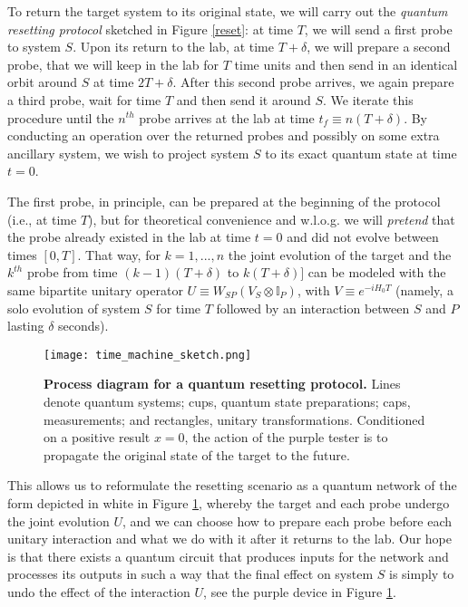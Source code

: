 \documentclass[twocolumn,prx,aps,longbibliography]{revtex4-1}
\def\id{{\mathbb I}}
\def\id{{\mathbb I}}
\begin{document}
To return the target system to its original state, we will carry out the \emph{quantum resetting protocol} sketched in Figure \ref{reset}: at time $T$, we will send a first probe to system $S$. Upon its return to the lab, at time $T+\delta$, we will prepare a second probe, that we will keep in the lab for $T$ time units and then send in an identical orbit around $S$ at time $2T+\delta$. After this second probe arrives, we again prepare a third probe, wait for time $T$ and then send it around $S$. We iterate this procedure until the $n^{th}$ probe arrives at the lab at time $t_f\equiv n(T+\delta)$. By conducting an operation over the returned probes and possibly on some extra ancillary system, we wish to project system $S$ to its exact quantum state at time $t=0$. 

The first probe, in principle, can be prepared at the beginning of the protocol (i.e., at time $T$), but for theoretical convenience and w.l.o.g. we will \emph{pretend} that the probe already existed in the lab at time $t=0$ and did not evolve between times $[0,T]$. That way, for $k=1,...,n$ the joint evolution of the target and the $k^{th}$ probe from time $(k-1)(T+\delta)$ to $k(T+\delta)]$ can be modeled with the same bipartite unitary operator $U\equiv W_{SP}(V_S\otimes \id_P)$, with $V\equiv e^{-iH_0T}$ (namely, a solo evolution of system $S$ for time $T$ followed by an interaction between $S$ and $P$ lasting $\delta$ seconds). 


\begin{figure}
  \centering
  \texttt{[image: time\_machine\_sketch.png]}
  \caption{\textbf{Process diagram for a quantum resetting protocol.} Lines denote quantum systems; cups, quantum state preparations; caps, measurements; and rectangles, unitary transformations. Conditioned on a positive result $x=0$, the action of the purple tester is to propagate the original state of the target to the future.}
  \label{sketch}
\end{figure}

This allows us to reformulate the resetting scenario as a quantum network of the form depicted in white in Figure \ref{sketch}, whereby the target and each probe undergo the joint evolution $U$, and we can choose how to prepare each probe before each unitary interaction and what we do with it after it returns to the lab. Our hope is that there exists a quantum circuit that produces inputs for the network and processes its outputs in such a way that the final effect on system $S$ is simply to undo the effect of the interaction $U$, see the purple device in Figure \ref{sketch}.  
\end{document}
